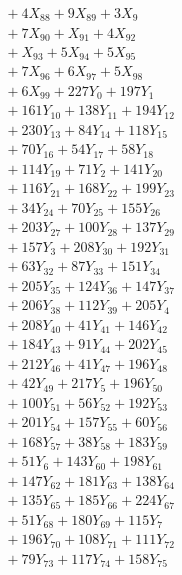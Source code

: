 \documentclass[a4paper,10pt]{article}
\begin{document}
{\begin{align}
&\quad  + 4X_{88} + 9X_{89} + 3X_{9} \\[0.5ex]
&\quad  + 7X_{90} + X_{91} + 4X_{92} \\[0.5ex]
&\quad  + X_{93} + 5X_{94} + 5X_{95} \\[0.5ex]
&\quad  + 7X_{96} + 6X_{97} + 5X_{98} \\[0.5ex]
&\quad  + 6X_{99} + 227Y_{0} + 197Y_{1} \\[0.5ex]
&\quad  + 161Y_{10} + 138Y_{11} + 194Y_{12} \\[0.5ex]
&\quad  + 230Y_{13} + 84Y_{14} + 118Y_{15} \\[0.5ex]
&\quad  + 70Y_{16} + 54Y_{17} + 58Y_{18} \\[0.5ex]
&\quad  + 114Y_{19} + 71Y_{2} + 141Y_{20} \\[0.5ex]
&\quad  + 116Y_{21} + 168Y_{22} + 199Y_{23} \\[0.5ex]
&\quad  + 34Y_{24} + 70Y_{25} + 155Y_{26} \\[0.5ex]
&\quad  + 203Y_{27} + 100Y_{28} + 137Y_{29} \\[0.5ex]
&\quad  + 157Y_{3} + 208Y_{30} + 192Y_{31} \\[0.5ex]
&\quad  + 63Y_{32} + 87Y_{33} + 151Y_{34} \\[0.5ex]
&\quad  + 205Y_{35} + 124Y_{36} + 147Y_{37} \\[0.5ex]
&\quad  + 206Y_{38} + 112Y_{39} + 205Y_{4} \\[0.5ex]
&\quad  + 208Y_{40} + 41Y_{41} + 146Y_{42} \\[0.5ex]
&\quad  + 184Y_{43} + 91Y_{44} + 202Y_{45} \\[0.5ex]
&\quad  + 212Y_{46} + 41Y_{47} + 196Y_{48} \\[0.5ex]
&\quad  + 42Y_{49} + 217Y_{5} + 196Y_{50} \\[0.5ex]
&\quad  + 100Y_{51} + 56Y_{52} + 192Y_{53} \\[0.5ex]
&\quad  + 201Y_{54} + 157Y_{55} + 60Y_{56} \\[0.5ex]
&\quad  + 168Y_{57} + 38Y_{58} + 183Y_{59} \\[0.5ex]
&\quad  + 51Y_{6} + 143Y_{60} + 198Y_{61} \\[0.5ex]
&\quad  + 147Y_{62} + 181Y_{63} + 138Y_{64} \\[0.5ex]
&\quad  + 135Y_{65} + 185Y_{66} + 224Y_{67} \\[0.5ex]
&\quad  + 51Y_{68} + 180Y_{69} + 115Y_{7} \\[0.5ex]
&\quad  + 196Y_{70} + 108Y_{71} + 111Y_{72} \\[0.5ex]
&\quad  + 79Y_{73} + 117Y_{74} + 158Y_{75} \\[0.5ex]

\end{align}}
\end{document}
